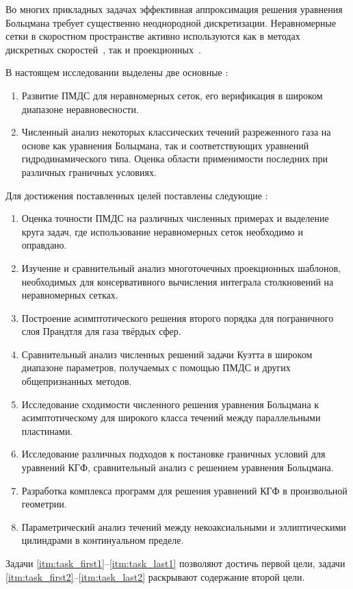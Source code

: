 Во многих прикладных задачах эффективная аппроксимация решения уравнения Больцмана
требует существенно неоднородной дискретизации.
Неравномерные сетки в скоростном пространстве активно используются
как в методах дискретных скоростей~\autocite{Morris2012, Kolobov2013},
так и проекционных~\autocite{Heintz2008, Wu2014}.

В настоящем исследовании выделены две основные {\aim}:
\begin{enumerate}
    \item Развитие ПМДС для неравномерных сеток, его верификация в широком диапазоне неравновесности.
    \item Численный анализ некоторых классических течений разреженного газа на основе
    как уравнения Больцмана, так и соответствующих уравнений гидродинамического типа.
    Оценка области применимости последних при различных граничных условиях.
\end{enumerate}
Для достижения поставленных целей поставлены следующие {\tasks}:
\begin{enumerate}
    \item Оценка точности ПМДС на различных численных примерах и выделение круга задач,
    где использование неравномерных сеток необходимо и оправдано.\label{itm:task_first1}
    \item Изучение и сравнительный анализ многоточечных проекционных шаблонов,
    необходимых для консервативного вычисления интеграла столкновений на неравномерных сетках.
    \item Построение асимптотического решения второго порядка
    для пограничного слоя Прандтля для газа твёрдых сфер. \label{itm:task_first2}
    \item Сравнительный анализ численных решений задачи Куэтта в широком диапазоне параметров,
    получаемых с помощью ПМДС и других общепризнанных методов.
    \item Исследование сходимости численного решения уравнения Больцмана к асимптотическому
    для широкого класса течений между параллельными пластинами.
    \item Исследование различных подходов к постановке граничных условий для уравнений КГФ,
    сравнительный анализ с решением уравнения Больцмана.\label{itm:task_last1}
    \item Разработка комплекса программ для решения уравнений КГФ в произвольной геометрии.
    \item Параметрический анализ течений между некоаксиальными и эллиптическими цилиндрами
    в континуальном пределе.\label{itm:task_last2}
\end{enumerate}
Задачи \ref{itm:task_first1}--\ref{itm:task_last1} позволяют достичь первой цели,
задачи \ref{itm:task_first2}--\ref{itm:task_last2} раскрывают содержание второй цели.

